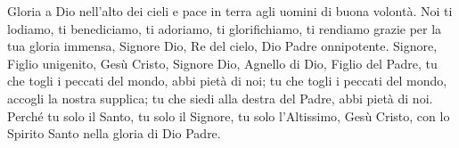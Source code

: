Gloria a Dio nell'alto dei cieli e pace in terra agli uomini di buona volontà.
Noi ti lodiamo, ti benediciamo, ti adoriamo, ti glorifichiamo, ti rendiamo grazie per la tua gloria immensa, Signore Dio, Re del cielo, Dio Padre onnipotente.
Signore, Figlio unigenito, Gesù Cristo, Signore Dio, Agnello di Dio, Figlio del Padre, tu che togli i peccati del mondo, abbi pietà di noi;
tu che togli i peccati del mondo, accogli la nostra supplica;
tu che siedi alla destra del Padre, abbi pietà di noi.
Perché tu solo il Santo, tu solo il Signore, tu solo l'Altissimo, Gesù Cristo, con lo Spirito Santo nella gloria di Dio Padre.
\amen
